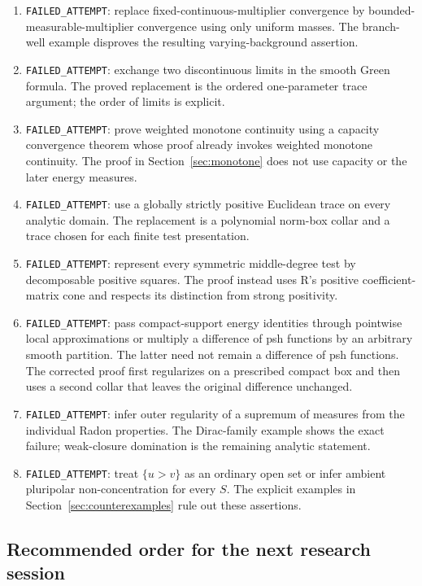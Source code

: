 \documentclass[11pt,a4paper]{article}
\numberwithin{equation}{section}
\theoremstyle{definition}
\theoremstyle{remark}
\begin{document}
\begin{enumerate}
\item \texttt{FAILED\_ATTEMPT}: replace fixed-continuous-multiplier
convergence by bounded-measurable-multiplier convergence using only
uniform masses. The branch-well example disproves the resulting
varying-background assertion.
\item \texttt{FAILED\_ATTEMPT}: exchange two discontinuous limits in
the smooth Green formula. The proved replacement is the ordered
one-parameter trace argument; the order of limits is explicit.
\item \texttt{FAILED\_ATTEMPT}: prove weighted monotone continuity
using a capacity convergence theorem whose proof already invokes
weighted monotone continuity. The proof in Section~\ref{sec:monotone}
does not use capacity or the later energy measures.
\item \texttt{FAILED\_ATTEMPT}: use a globally strictly positive
Euclidean trace on every analytic domain. The replacement is a
polynomial norm-box collar and a trace chosen for each finite test
presentation.
\item \texttt{FAILED\_ATTEMPT}: represent every symmetric middle-degree
test by decomposable positive squares. The proof instead uses R's
positive coefficient-matrix cone and respects its distinction from
strong positivity.
\item \texttt{FAILED\_ATTEMPT}: pass compact-support energy identities
through pointwise local approximations or multiply a difference of
psh functions by an arbitrary smooth partition. The latter need not
remain a difference of psh functions. The corrected proof first
regularizes on a prescribed compact box and then uses a second
collar that leaves the original difference unchanged.
\item \texttt{FAILED\_ATTEMPT}: infer outer regularity of a supremum
of measures from the individual Radon properties. The Dirac-family
example shows the exact failure; weak-closure domination is the
remaining analytic statement.
\item \texttt{FAILED\_ATTEMPT}: treat $\{u>v\}$ as an ordinary open
set or infer ambient pluripolar non-concentration for every $S$.
The explicit examples in Section~\ref{sec:counterexamples} rule out
these assertions.
\end{enumerate}

\subsection{Recommended order for the next research session}
\end{document}
